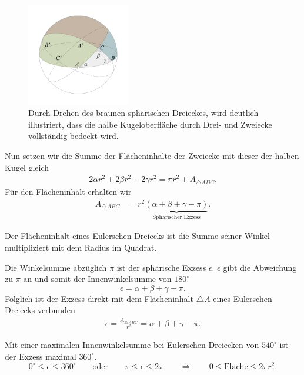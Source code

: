 \begin{refsection}
\begin{figure}[htbp]
\centering
\includegraphics[width=0.4\textwidth]{kugel/HalbeKugel.jpg}
\caption{Durch Drehen des braunen sphärischen Dreieckes, wird
deutlich illustriert, dass die halbe Kugeloberfläche durch Drei-
und Zweiecke vollständig bedeckt wird.}
\label{V9}
\end{figure}

Nun setzen wir die Summe der Flächeninhalte der Zweiecke mit dieser
der halben Kugel gleich
\begin{align*}
2 \alpha r^2 + 2 \beta r^2 + 2 \gamma  r^2 = \pi r^2 + A_{ \triangle{ ABC }}.
\end{align*}
Für den Flächeninhalt erhalten wir
\begin{align*}
A_{ \triangle{ ABC }}
&=
r^{ 2 }\underbrace{(\alpha + \beta + \gamma - \pi)}_{\displaystyle\text{Sphärischer Exzess}}.
\end{align*}

\begin{definition}
Der Flächeninhalt eines Eulerschen Dreiecks ist die Summe seiner
Winkel multipliziert mit dem Radius im Quadrat.
\label{skript:kugel:satz:Flaecheninhalt}
%
\end{definition}


Die Winkelsumme abzüglich $\pi$ ist der sphärische Exzess $\epsilon$.
$\epsilon$ gibt die Abweichung zu $\pi$ an und somit der Innenwinkelsumme
von $180^{\circ}$
\begin{equation}
\epsilon = \alpha + \beta + \gamma - \pi.
\end{equation}
Folglich ist der Exzess direkt mit dem Flächeninhalt $\triangle A$
eines Eulerschen Dreiecks verbunden
\begin{align*}
\epsilon =\frac{A_{\triangle{ ABC }}}{r^2} = {\alpha + \beta + \gamma - \pi}.
\end{align*}

Mit einer maximalen Innenwinkelsumme bei Eulerschen Dreiecken von
$540^{\circ}$ ist der Exzess maximal $360^{\circ}$.
\[
0^{\circ} \le \epsilon \le 360^{\circ}
\qquad \text{oder} \qquad
\pi \le \epsilon \le 2\pi
\qquad \Rightarrow \qquad
0 \le \text{Fläche} \le 2 \pi r^2.
\]


\end{refsection}
